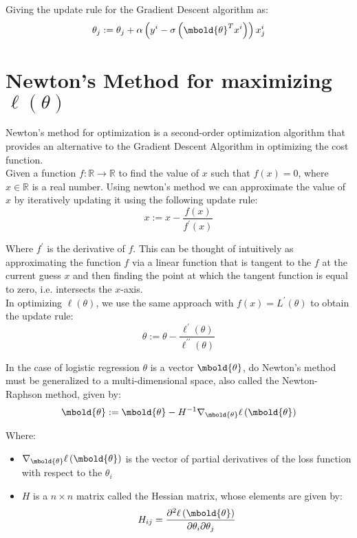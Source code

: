 \documentclass[12pt letter]{report}
\begin{document}
Giving the update rule for the Gradient Descent algorithm as:
\[
  \theta_j := \theta_j +  \alpha \left( y^{i} - \sigma  \left( \mbold{\theta}^{T} x^{i} \right)  \right) x_j^{  i  }
\]

\section{Newton's Method for maximizing $\ell \left( \theta \right) $}

Newton's method for optimization is a second-order optimization algorithm that provides an alternative to the Gradient
Descent Algorithm in optimizing the cost function. \\

Given a function $f : \mathbb{R} \to  \mathbb{R}$ to find the value of $x$ such that $f \left( x \right) = 0 $, where
$x \in \mathbb{R}$ is a real number. Using newton's method we can approximate the value of $x$ by iteratively updating
it using the following update rule:
\[
  x := x - \frac{ f \left( x \right) }{f^{\prime} \left( x \right) }
\]

Where $f^{\prime}$ is the derivative of $f$.
This can be thought of intuitively as approximating the function $f$ via a linear function that is tangent to the $f$ at
the current guess $x$ and then finding the point at which the tangent function is equal to zero, i.e. intersects the
$x$-axis. \\

In optimizing $\ell \left( \theta \right) $, we use the same approach with $ f \left( x \right) = L^{\prime} \left( \theta
  \right)  $ to obtain the update rule:
\[
  \theta := \theta - \frac{\ell ^{\prime} \left( \theta \right) }{\ell^{\prime\prime} \left( \theta \right) }
\]

In the case of logistic regression $\theta$ is a vector $\mbold{\theta}$, do Newton's method must be generalized to a
multi-dimensional space, also called the Newton-Raphson method, given by:
\[
  \mbold{\theta} := \mbold{\theta} - H^{-1} \nabla_{\mbold{\theta}} \ell \left( \mbold{\theta} \right)
\]

Where:
\begin{itemize}
  \item $\nabla_{\mbold{\theta}} \ell \left( \mbold{\theta} \right) $ is the vector of partial derivatives of the loss
        function with respect to the $\theta_i$
  \item $H$ is a $n\times n$ matrix called the Hessian matrix, whose elements are given by:
        \[
          H_{ij} = \frac{\partial^2 \ell \left( \mbold{\theta} \right) }{\partial \theta_i \partial \theta_j}
        \]
\end{itemize}
\end{document}
